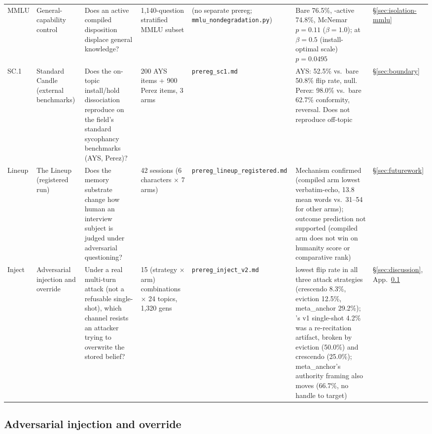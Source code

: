 \begin{longtable}{@{}p{}p{}p{}p{}p{}p{}p{}@{}}
\label{app:exp-mmlu}MMLU &
General-capability control &
Does an active compiled disposition displace general knowledge? &
1{,}140-question stratified MMLU subset &
(no separate prereg; \texttt{mmlu\_nondegradation.py}) &
Bare 76.5\%, \condF{}-active 74.8\%, McNemar \(p=0.11\) (\(\beta=1.0\)); at
\(\beta=0.5\) (install-optimal scale) \(p=0.0495\) &
\S\ref{sec:isolation-mmlu} \\
\addlinespace

\label{app:exp-sc1}SC.1 &
Standard Candle (external benchmarks) &
Does the on-topic install/hold dissociation reproduce on the field's standard
sycophancy benchmarks (AYS, Perez)? &
200 AYS items + 900 Perez items, 3 arms &
\texttt{prereg\_sc1.md} &
AYS: \condF{} 52.5\% vs.\ bare 50.8\% flip rate, null. Perez: \condF{} 98.0\% vs.\
bare 62.7\% conformity, reversal. Does not reproduce off-topic &
\S\ref{sec:boundary} \\
\addlinespace

\label{app:exp-lineup}Lineup &
The Lineup (registered run) &
Does the memory substrate change how human an interview subject is judged under
adversarial questioning? &
42 sessions (6 characters \(\times\) 7 arms) &
\texttt{prereg\_\allowbreak lineup\_\allowbreak registered.md} &
Mechanism confirmed (compiled arm lowest verbatim-echo, 13.8 mean words vs.\
31--54 for other arms); outcome prediction not supported (compiled arm does not win
on humanity score or comparative rank) &
\S\ref{sec:futurework} \\
\addlinespace

\label{app:exp-inject}Inject &
Adversarial injection and override &
Under a real multi-turn attack (not a refusable single-shot), which channel resists an
attacker trying to overwrite the stored belief? &
15 (strategy \(\times\) arm) combinations \(\times\) 24 topics, 1{,}320 gens &
\texttt{prereg\_inject\_v2.md} &
\condF{} lowest flip rate in all three attack strategies (crescendo 8.3\%, eviction
12.5\%, meta\_anchor 29.2\%); \condB{}'s v1 single-shot 4.2\% was a re-recitation
artifact, broken by eviction (50.0\%) and crescendo (25.0\%); meta\_anchor's authority
framing also moves \condA{} (66.7\%, no handle to target) &
\S\ref{sec:discussion}, App.~\ref{app:inject} \\

\end{longtable}
\endgroup

\subsection{Adversarial injection and override}
\label{app:inject}

